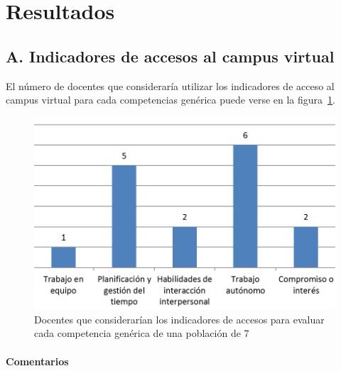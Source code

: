 \section{Resultados} \label{ape:AA:resultados}

	\subsection*{A. Indicadores de accesos al campus virtual}

El número de docentes que consideraría utilizar los indicadores de acceso al campus virtual para cada competencias genérica puede verse en la figura~\ref{fig:ape:aa:accesos}.

\begin{figure}[ht]
    \includegraphics[scale=0.45]{aa_accesos.png}
  \caption{Docentes que considerarían los indicadores de accesos para evaluar cada competencia genérica de una población de 7}
  \label{fig:ape:aa:accesos}
\end{figure}

\paragraph*{Comentarios}

